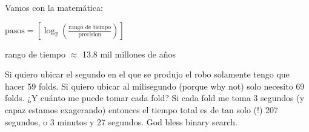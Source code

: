 \documentclass[12pt]{article}
\begin{document}
\vspace{0.5em}

Vamos con la matemática:

\begin{center}
$\text{pasos} = \left[ \log_2 \left( \frac{\text{rango de tiempo}}{\text{precision}} \right) \right]$
\end{center}

\begin{center}
rango de tiempo $\approx$ 13.8 mil millones de años
\end{center}

Si quiero ubicar el segundo en el que se produjo el robo solamente tengo que hacer 59 folds. Si quiero ubicar al milisegundo (porque why not) solo necesito 69 folds. ¿Y cuánto me puede tomar cada fold? Si cada fold me toma 3 segundos (y capaz estamos exagerando) entonces el tiempo total es de tan solo (!) 207 segundos, o 3 minutos y 27 segundos. God bless binary search.
\end{document}
